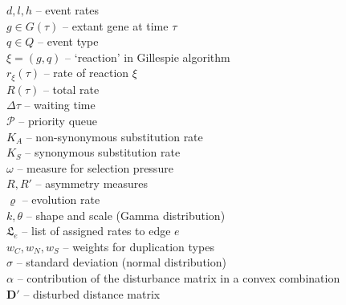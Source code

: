 \documentclass[hidelinks,11pt]{scrreprt}
\begin{document}
{\begin{minipage}[t]{0.47\textwidth}
		\vspace{2mm}
		\noindent
		$d, l, h$ -- event rates\\
		$g\in G(\tau)$ -- extant gene at time $\tau$\\
		$q\in Q$ -- event type\\
		$\xi=(g,q)$ -- `reaction' in Gillespie algorithm\\
		$r_{\xi}(\tau)$ -- rate of reaction $\xi$\\
		$R(\tau)$ -- total rate\\
		$\Delta\tau$ -- waiting time\\
		$\mathcal{P}$ -- priority queue\\
		$K_A$ -- non-synonymous substitution rate\\
		$K_S$ -- synonymous substitution rate\\
		$\omega$ -- measure for selection pressure\\
		$R,R'$ -- asymmetry measures\\
		$\varrho$ -- evolution rate\\
		$k, \theta$ -- shape and scale (Gamma distribution)\\
		$\mathfrak{L}_e$ -- list of assigned rates to edge $e$\\
		$w_C, w_N, w_S$ -- weights for duplication types\\
		$\sigma$ -- standard deviation (normal distribution)\\
		$\alpha$ -- contribution of the disturbance matrix in a convex combination\\
		$\mathbf{D'}$ -- disturbed distance matrix\\
		
	\end{minipage}
	
}
\end{document}

